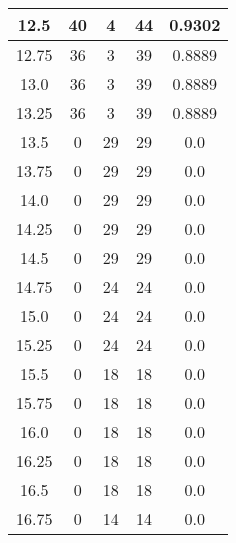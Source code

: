 \documentclass[letterpaper, 12pt]{article}
\begin{document}
\begin{longtable}{|c|c|c|c|c|}
12.5 & 40 & 4 & 44 & 0.9302 \\
\hline
12.75 & 36 & 3 & 39 & 0.8889 \\
\hline
13.0 & 36 & 3 & 39 & 0.8889 \\
\hline
13.25 & 36 & 3 & 39 & 0.8889 \\
\hline
13.5 & 0 & 29 & 29 & 0.0 \\
\hline
13.75 & 0 & 29 & 29 & 0.0 \\
\hline
14.0 & 0 & 29 & 29 & 0.0 \\
\hline
14.25 & 0 & 29 & 29 & 0.0 \\
\hline
14.5 & 0 & 29 & 29 & 0.0 \\
\hline
14.75 & 0 & 24 & 24 & 0.0 \\
\hline
15.0 & 0 & 24 & 24 & 0.0 \\
\hline
15.25 & 0 & 24 & 24 & 0.0 \\
\hline
15.5 & 0 & 18 & 18 & 0.0 \\
\hline
15.75 & 0 & 18 & 18 & 0.0 \\
\hline
16.0 & 0 & 18 & 18 & 0.0 \\
\hline
16.25 & 0 & 18 & 18 & 0.0 \\
\hline
16.5 & 0 & 18 & 18 & 0.0 \\
\hline
16.75 & 0 & 14 & 14 & 0.0 \\
\hline
\end{longtable}
\end{document}
